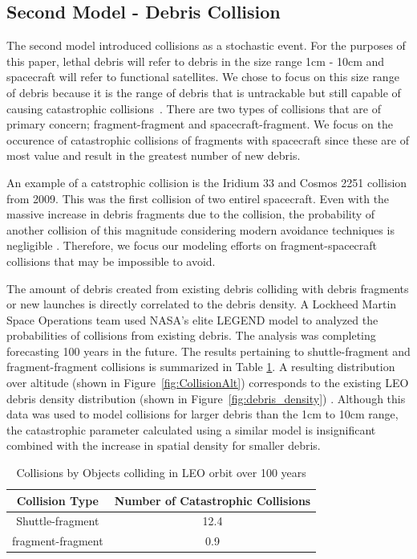 \documentclass[pre,12pt]{revtex4-1}
\begin{document}
\subsection{Second Model - Debris Collision}

The second model introduced collisions as a stochastic event. For the purposes of this paper, lethal debris will refer to debris in the size range 1cm - 10cm and spacecraft will refer to functional satellites. We chose to focus on this size range of debris because it is the range of debris that is untrackable but still capable of causing catastrophic collisions~\cite{lethal_debris}. There are two types of collisions that are of primary concern; fragment-fragment and spacecraft-fragment. We focus on the occurence of catastrophic collisions of fragments with spacecraft since these are of most value and result in the greatest number of new debris. 

An example of a catstrophic collision is the Iridium 33 and Cosmos 2251 collision from 2009. This was the first collision of two entirel spacecraft. Even with the massive increase in debris fragments due to the collision, the probability of another collision of this magnitude considering modern avoidance techniques is negligible \cite{IridiumProbs}. Therefore, we focus our modeling efforts on fragment-spacecraft collisions that may be impossible to avoid.


The amount of debris created from existing debris colliding with debris fragments or new launches is directly correlated to the debris density. A Lockheed Martin Space Operations team used NASA's elite LEGEND model to analyzed the probabilities of collisions from existing debris. The analysis was completing forecasting 100 years in the future. The results pertaining to shuttle-fragment and fragment-fragment collisions is summarized in Table \ref{table:CollisionAlt}. A resulting distribution over altitude (shown in Figure~\ref{fig:CollisionAlt}) corresponds to the existing LEO debris density distribution (shown in Figure~\ref{fig:debris_density}) \citep{CollisionProbs}. Although this data was used to model collisions for larger debris than the 1cm to 10cm range, the catastrophic parameter calculated using a similar model \cite{CollisionProbs2} is insignificant combined with the increase in spatial density for smaller debris.


\begin{table}[htb]
\centering
    \begin{tabular}{| c | c |} \hline
    \textbf{Collision Type} & \textbf{Number of Catastrophic Collisions} \\ \hline
    Shuttle-fragment & 12.4\\ \hline
    fragment-fragment & 0.9\\ \hline
    \end{tabular}
\caption{Collisions by Objects colliding in LEO orbit over 100 years}
\label{table:CollisionAlt}
\end{table}
\end{document}
